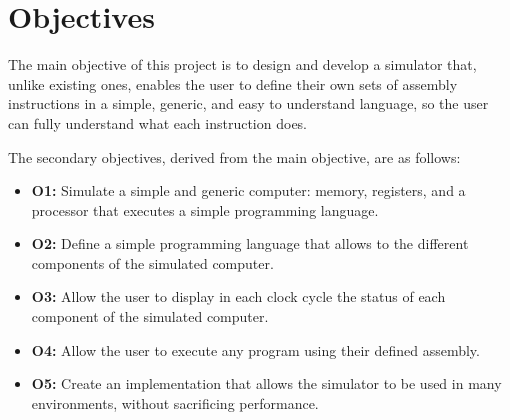 \section{Objectives}\label{sec:objectives}
The main objective of this project is to design and develop a simulator that, unlike existing ones, enables the user to define their own sets of \gls{assembly} instructions in a simple, generic, and easy to understand language, so the user can fully understand what each instruction does.

\noindent
The secondary objectives, derived from the main objective, are as follows:
\begin{itemize}
  \item \textbf{O1:} Simulate a simple and generic \gls{computer}: \gls{memory}, \glspl{register}, and a \gls{processor} that executes a simple \gls{programming language}.
  \item \textbf{O2:} Define a simple \gls{programming language} that allows to  the different components of the simulated \gls{computer}.
  \item \textbf{O3:} Allow the user to display in each \gls{clock cycle} the status of each component of the simulated
  \gls{computer}.
  \item \textbf{O4:} Allow the user to execute any program using their defined \gls{assembly}.
  \item \textbf{O5:} Create an implementation that allows the simulator to be used in many environments, without sacrificing performance.
\end{itemize}



